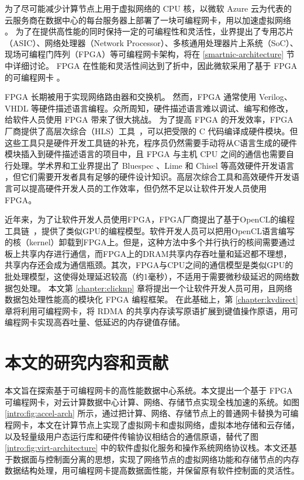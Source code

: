 为了尽可能减少计算节点上用于虚拟网络的 CPU 核，以微软 Azure 云为代表的云服务商在数据中心的每台服务器上部署了一块可编程网卡，用以加速虚拟网络 \cite{smartnic}。
为了在提供高性能的同时保持一定的可编程性和灵活性，业界提出了专用芯片（ASIC）、网络处理器（Network Processor）、多核通用处理器片上系统（SoC）、现场可编程门阵列（FPGA）等可编程网卡架构，将在 \ref{smartnic-architecture} 节中详细讨论。
FPGA 在性能和灵活性间达到了折中，因此微软采用了基于 FPGA 的可编程网卡 \cite{putnam2014reconfigurable}。

FPGA 长期被用于实现网络路由器和交换机。
然而，FPGA 通常使用 Verilog、VHDL 等硬件描述语言编程。众所周知，硬件描述语言难以调试、编写和修改，给软件人员使用 FPGA 带来了很大挑战。
为了提高 FPGA 的开发效率，FPGA厂商提供了高层次综合（HLS）工具~\cite{vivado,intel-hls}，可以把受限的 C 代码编译成硬件模块。但这些工具只是硬件开发工具链的补充，程序员仍然需要手动将从C语言生成的硬件模块插入到硬件描述语言的项目中，且 FPGA 与主机 CPU 之间的通信也需要自行处理。学术界和工业界提出了 Bluespec \cite{bluespec}、Lime \cite{auerbach2010lime} 和 Chisel \cite{bachrach2012chisel} 等高效硬件开发语言 \cite{bacon2013fpga,singh2011implementing,wester2015transformation}，但它们需要开发者具有足够的硬件设计知识。高层次综合工具和高效硬件开发语言可以提高硬件开发人员的工作效率，但仍然不足以让软件开发人员使用 FPGA。

近年来，为了让软件开发人员使用FPGA，FPGA厂商提出了基于OpenCL的编程工具链~\cite{aoc,sdaccel}，提供了类似GPU的编程模型。软件开发人员可以把用OpenCL语言编写的核（kernel）卸载到FPGA上。但是，这种方法中多个并行执行的核间需要通过板上共享内存进行通信，而FPGA上的DRAM共享内存吞吐量和延迟都不理想，共享内存还会成为通信瓶颈。其次，FPGA与CPU之间的通信模型是类似GPU的批处理模型，这使得处理延迟较高（约1毫秒），不适用于需要微秒级延迟的网络数据包处理。
本文第 \ref{chapter:clicknp} 章将提出一个让软件开发人员可用，且网络数据包处理性能高的模块化 FPGA 编程框架。
在此基础上，第 \ref{chapter:kvdirect} 章将利用可编程网卡，将 RDMA 的共享内存读写原语扩展到键值操作原语，用可编程网卡实现高吞吐量、低延迟的内存键值存储。






\section{本文的研究内容和贡献}


本文旨在探索基于可编程网卡的高性能数据中心系统。本文提出一个基于 FPGA 可编程网卡，对云计算数据中心计算、网络、存储节点实现全栈加速的系统。如图 \ref{intro:fig:accel-arch} 所示，通过把计算、网络、存储节点上的普通网卡替换为可编程网卡，本文在计算节点上实现了虚拟网卡和虚拟网络，虚拟本地存储和云存储，以及轻量级用户态运行库和硬件传输协议相结合的通信原语，替代了图 \ref{intro:fig:virt-architecture} 中的软件虚拟化服务和操作系统网络协议栈。本文还基于数据面与控制面分离的思想，实现了网络节点的虚拟网络功能和存储节点的内存数据结构处理，用可编程网卡提高数据面性能，并保留原有软件控制面的灵活性。


